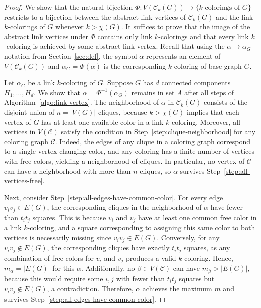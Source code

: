 \documentclass{amsart}
\theoremstyle{hypothesisstyle}
\newcommand{\set}[1]{\{#1\}}
\theoremstyle{definition}
\theoremstyle{remark}
\numberwithin{equation}{section}
\newcommand{\abs}[1]{\lvert#1\rvert}
\newcommand{\C}{\mathcal C}
\begin{document}
\begin{proof} We show that the natural bijection $\Phi\colon V(\C_k(G))\to\set{\text{$k$-colorings of $G$}} $ restricts to a bijection between the abstract link vertices of $\C_k(G)$ and the link $k$-colorings of $G$ whenever $k>\chi(G)$. It suffices to prove that the image of the abstract link vertices under $\Phi$ contains only link $k$-colorings and that every link $k$-coloring is achieved by some abstract link vertex. Recall that using the $\alpha\mapsto\alpha_G$ notation from Section~\ref{sec:def}, the symbol $\alpha$ represents an element of $V(\C_k(G))$ and $\alpha_G=\Phi(\alpha)$ is the corresponding $k$-coloring of base graph $G$. 

Let $\alpha_G$ be a link $k$-coloring of $G$. Suppose $G$ has $d$ connected components $H_1,\dots,H_d$. We show that $\alpha=\Phi^{-1}(\alpha_G)$ remains in set $A$ after all steps of Algorithm~\ref{algo:link-vertex}. The neighborhood of $\alpha$ in $\C_k(G)$ consists of the disjoint union of $n=\abs{V(G)}$ cliques, because $k>\chi(G)$ implies that each vertex of $G$ has at least one available color in a link $k$-coloring. Moreover, all vertices in $V(\C)$ satisfy the condition in Step~\ref{step:clique-neighborhood} for any coloring graph $\C$. Indeed, the edges of any clique in a coloring graph correspond to a single vertex changing color, and any coloring has a finite number of vertices with free colors, yielding a neighborhood of cliques. In particular, no vertex of $\C$ can have a neighborhood with more than $n$ cliques, so $\alpha$ survives Step~\ref{step:all-vertices-free}. 

Next, consider Step~\ref{step:all-edges-have-common-color}. For every edge $v_iv_j\in E(G)$, the corresponding cliques in the neighborhood of $\alpha$ have fewer than $t_it_j$ squares. This is because $v_i$ and $v_j$ have at least one common free color in a link $k$-coloring, and a square corresponding to assigning this same color to both vertices is necessarily missing since $v_iv_j\in E(G)$. Conversely, for any $v_iv_j\not\in E(G)$, the corresponding cliques have exactly $t_it_j$ squares, as any combination of free colors for $v_i$ and $v_j$ produces a valid $k$-coloring. Hence, $m_\alpha=|E(G)|$ for this $\alpha$. Additionally, no $\beta\in V(\C)$ can have $m_\beta>\abs{E(G)}$, because this would require some $i,j$ with fewer than $t_it_j$ squares but $v_iv_j\not\in E(G)$, a contradiction. Therefore, $\alpha$ achieves the maximum $m$ and survives Step~\ref{step:all-edges-have-common-color}. 


\end{proof}
\end{document}
